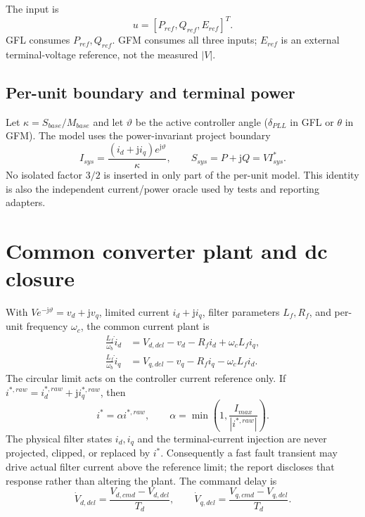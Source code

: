 \documentclass[12pt,a4paper]{article}
\begin{document}
The input is
\begin{equation}
u=[P_{ref},Q_{ref},E_{ref}]^T .
\end{equation}
GFL consumes $P_{ref},Q_{ref}$. GFM consumes all three inputs; $E_{ref}$ is an external
terminal-voltage reference, not the measured $|V|$.

\subsection{Per-unit boundary and terminal power}

Let $\kappa=S_{base}/M_{base}$ and let $\vartheta$ be the active controller angle
($\delta_{PLL}$ in GFL or $\theta$ in GFM). The model uses the power-invariant project boundary
\begin{equation}
I_{sys}=\frac{(i_d+\mathrm{j}i_q)e^{\mathrm{j}\vartheta}}{\kappa},\qquad
S_{sys}=P+\mathrm{j}Q=V I_{sys}^{*}.
\label{eq:power-boundary}
\end{equation}
No isolated factor $3/2$ is inserted in only part of the per-unit model. This identity is also the
independent current/power oracle used by tests and reporting adapters.

\section{Common converter plant and dc closure}

With $V e^{-\mathrm{j}\vartheta}=v_d+\mathrm{j}v_q$, limited current
$i_d+\mathrm{j}i_q$, filter parameters $L_f,R_f$, and per-unit frequency $\omega_c$, the common
current plant is
\begin{align}
\frac{L_f}{\omega_b}\dot i_d&=V_{d,del}-v_d-R_f i_d+\omega_cL_f i_q,\\
\frac{L_f}{\omega_b}\dot i_q&=V_{q,del}-v_q-R_f i_q-\omega_cL_f i_d.
\end{align}
The circular limit acts on the controller current reference only.  If
$i^{*,raw}=i_d^{*,raw}+\mathrm{j}i_q^{*,raw}$, then
\begin{equation}
i^*=\alpha i^{*,raw},\qquad
\alpha=\min\!\left(1,\frac{I_{max}}{|i^{*,raw}|}\right).
\end{equation}
The physical filter states $i_d,i_q$ and the terminal-current injection are never projected,
clipped, or replaced by $i^*$. Consequently a fast fault transient may drive actual filter current
above the reference limit; the report discloses that response rather than altering the plant.
The command delay is
\begin{equation}
\dot V_{d,del}=\frac{V_{d,cmd}-V_{d,del}}{T_d},\qquad
\dot V_{q,del}=\frac{V_{q,cmd}-V_{q,del}}{T_d}.
\end{equation}
\end{document}
